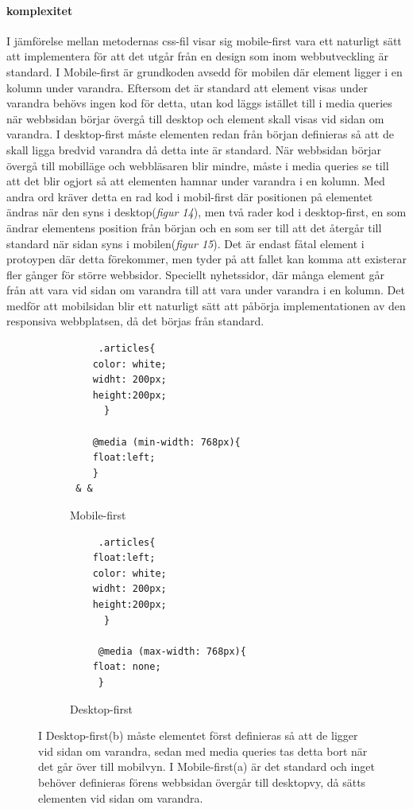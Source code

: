 \documentclass[11pt]{article}
\begin{document}
\paragraph{komplexitet}\mbox{}

I jämförelse mellan metodernas css-fil visar sig mobile-first vara ett naturligt sätt att implementera för att det utgår från en design som inom webbutveckling är standard. I Mobile-first är grundkoden avsedd för mobilen där element ligger i en kolumn under varandra. Eftersom det är standard att element visas under varandra behövs ingen kod för detta, utan kod läggs istället till i media queries när webbsidan börjar övergå till desktop och element skall visas vid sidan om varandra. I desktop-first måste elementen redan från början definieras så att de skall ligga bredvid varandra då detta inte är standard. När webbsidan börjar övergå till mobilläge och webbläsaren blir mindre, måste i media queries se till att det blir ogjort så att elementen hamnar under varandra i en kolumn. Med andra ord kräver detta en rad kod i mobil-first där positionen på elementet ändras när den syns i desktop(\textit{figur 14}), men två rader kod i desktop-first, en som ändrar elementens position från början och en som ser till att det återgår till standard när sidan syns i mobilen(\textit{figur 15}). Det är endast fåtal element i protoypen där detta förekommer, men tyder på att fallet kan komma att existerar fler gånger för större webbsidor. Speciellt nyhetssidor, där många element går från att vara vid sidan om varandra till att vara under varandra i en kolumn. Det medför att mobilsidan blir ett naturligt sätt att påbörja implementationen av den responsiva webbplatsen, då det börjas från standard. 

\setcounter{figure}{13}
\begin{figure}[H]
  \begin{subfigure}[b]{.5\linewidth }

    \begin{lstlisting}
     .articles{
	color: white;
	widht: 200px;
	height:200px;
      }

    @media (min-width: 768px){
	float:left;
    }
 & &
    \end{lstlisting}
    \caption{Mobile-first}
    \end{subfigure}
    \begin{subfigure}[b]{.5\linewidth}
	\begin{lstlisting}
     .articles{
	float:left;
	color: white;
	widht: 200px;
	height:200px;
      }

     @media (max-width: 768px){
	float: none;  
     }
	\end{lstlisting}
    \caption{Desktop-first}
  \end{subfigure}
  \caption{I Desktop-first(b) måste elementet först definieras så att de ligger vid sidan om varandra, sedan med media queries tas detta bort när det går över till mobilvyn. I Mobile-first(a) är det standard och inget behöver definieras förens webbsidan övergår till desktopvy, då sätts elementen vid sidan om varandra.}
\end{figure}
\newpage
\end{document}
